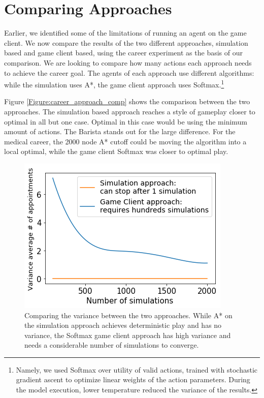 \documentclass[letterpaper]{article} %
\begin{document}
\section{Comparing Approaches}

Earlier, we identified some of the limitations of running an agent on the game client. We now compare the results of the two different approaches, simulation based and  game client based, using the career experiment as the basis of our comparison. We are looking to compare how many actions each approach needs to achieve the career goal. The agents of each approach use different algorithms: while the simulation uses A*, the game client approach uses Softmax.\footnote{Namely, we used Softmax over utility of valid actions, trained with stochastic gradient ascent to optimize linear weights of the action parameters.
During the model execution, lower temperature reduced the variance of the results.
}

Figure \ref{Figure:career_approach_comp} shows the comparison between the two approaches. The simulation based approach reaches a style of gameplay closer to optimal in all but one case. Optimal in this case would be using the minimum amount of actions. The Barista stands out for the large difference. For the medical career, the 2000 node A* cutoff could be moving the algorithm into a local optimal, while the game client Softmax was closer to optimal play.

\begin{figure}[t]
  \centering
  \includegraphics[width=0.943\linewidth]{images/career_average.png}
  \caption{Comparing the variance between the two approaches. While A* on the simulation approach achieves deterministic play and has no variance, the Softmax game client approach has high variance and needs a considerable number of simulations to converge.}
  \label{Figure:approach_variance_comp}
\end{figure}
\end{document}
